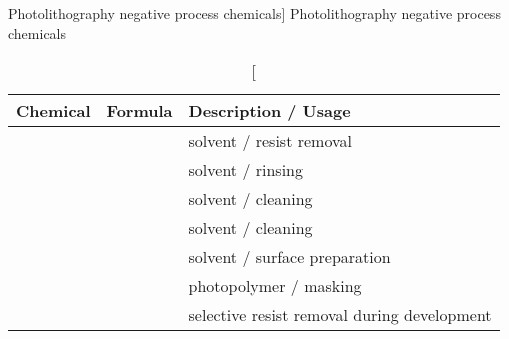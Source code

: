 \documentclass[../main.tex]{subfiles}%
\begin{document}
%
    \Xtable%
    \begin{table}%
        \caption%
            [Photolithography negative process chemicals]%
            {Photolithography negative process chemicals}%
        \label{tbl:pattern-process-neg-chemicals}%
        \begin{tabu}{ l c l }%
            \toprule%
            \centering\textbf{Chemical} &%
            \centering\textbf{Formula} &%
            \centering\textbf{Description / Usage}\\%
            \toprule%
             &%
             &%
            solvent / resist removal\\%
             &%
             &%
            solvent / rinsing\\%
             &%
             &%
            solvent / cleaning\\%
             &%
             &%
            solvent / cleaning\\%
             &%
             &%
            solvent / surface preparation\\%
             &%
             &%
            photopolymer / masking\\%
             &%
             &%
            selective resist removal during development\\%

\end{tabu}
\end{table}
\end{document}
